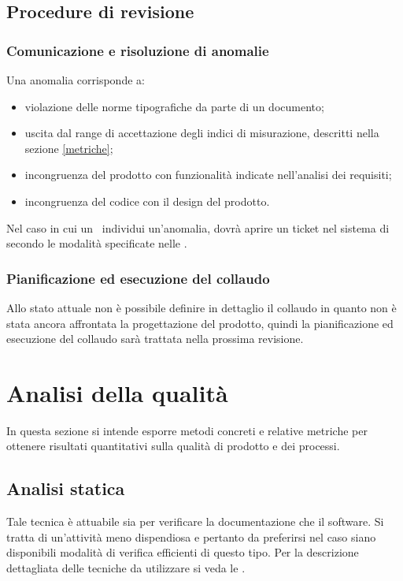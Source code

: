 \documentclass[12pt,a4paper]{article}
\begin{document}
\subsection{Procedure di revisione}
\subsubsection{Comunicazione e risoluzione di anomalie}
Una anomalia corrisponde a:
\begin{itemize}
	\item violazione delle norme tipografiche da parte di un documento;
	\item uscita dal range di accettazione degli indici di misurazione, descritti nella sezione \ref{metriche};
	\item incongruenza del prodotto con funzionalità indicate nell'analisi dei requisiti;
	\item incongruenza del codice con il design del prodotto.
\end{itemize}
Nel caso in cui un \VR\ individui un'anomalia, dovrà aprire un ticket nel sistema di  secondo le modalità specificate nelle \NdP.
\subsubsection{Pianificazione ed esecuzione del collaudo}
Allo stato attuale non è possibile definire in dettaglio il collaudo in quanto non è stata ancora affrontata la progettazione del prodotto, quindi la pianificazione ed esecuzione del collaudo sarà trattata nella prossima revisione.
\newpage

\section{Analisi della qualità}\label{analisi}
In questa sezione si intende esporre metodi concreti e relative metriche per ottenere risultati quantitativi sulla qualità di prodotto e dei processi. 

\subsection{Analisi statica}
Tale tecnica è attuabile sia per verificare la documentazione che il software. Si tratta di un'attività meno dispendiosa e pertanto da preferirsi nel caso siano disponibili modalità di verifica efficienti di questo tipo. Per la descrizione dettagliata delle tecniche da utilizzare si veda le \NdP.
\end{document}
